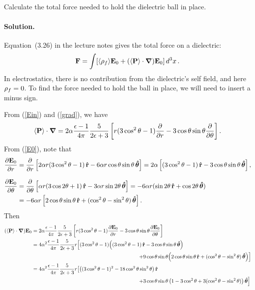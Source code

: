 \documentclass[11pt]{article}
\newcommand{\refeq}[1]{(\ref{#1})}
\newcommand{\beq}{\begin{equation*}}
\newcommand{\eeq}{\end{equation*}}
\newenvironment{problem}
{
	\subsection{}
	\color{darkgray}
    \ignorespaces
}
{

}
\newenvironment{solution}
{
    \paragraph{Solution.}
    \ignorespaces
}
{
    \bigskip
}
\begin{document}
\newcommand{\vF}{\vb{F}}

\begin{problem}
	Calculate the total force needed to hold the dielectric ball in place.
\end{problem}

\begin{solution}
	Equation~(3.26) in the lecture notes gives the total force on a dielectric:
	\beq
		\vF = \int [\evrhof\! \vEo + (\evP \cdot \grad) \vEo] \dcx.
	\eeq
	In electrostatics, there is no contribution from the dielectric's self field, and here $\rho_f = 0$.  To find the force needed to hold the ball in place, we will need to insert a minus sign.
	
	From \refeq{Ein} and \refeq{grad}, we have
	\beq
		\evP \cdot \grad = 2\alp \frac{\eps - 1}{4\pi} \frac{5}{2\eps + 3} \left[ r (3 \cos^2\tht - 1) \pdv{}{r} - 3 \cost \sint \pdv{}{\tht} \right].
	\eeq
	From \refeq{E0}, note that
	\begin{align*}
		\pdv{\vb{E}_0}{r} &= \pdv{}{r} \left[ 2 \alpha r (3 \cos^2\theta - 1) \,\vb{\hat{r}} - 6 \alpha r \cos\theta \sin\theta \,\boldsymbol{\hat{\theta}} \right]
		= 2 \alpha \left[ (3 \cos^2\theta - 1) \,\vb{\hat{r}} - 3 \cos\theta \sin\theta \,\boldsymbol{\hat{\theta}} \right], \\[2ex]
		\pdv{\vb{E}_0}{\theta} &= \pdv{}{\theta} \left[ \alpha r (3 \cos2\theta + 1) \,\vb{\hat{r}} - 3 \alpha r \sin2\theta \,\boldsymbol{\hat{\theta}} \right]
		= -6\alpha r (\sin2\theta \,\vb{\hat{r}} + \cos2\theta \,\boldsymbol{\hat{\theta}}) \\
		&= -6 \alpha r \left[ 2 \cos\theta \sin\theta \,\vb{\hat{r}} + (\cos^2\theta - \sin^2\theta) \,\boldsymbol{\hat{\theta}} \right].
	\end{align*}
	Then
	\begin{align*}
		(\evP \cdot \grad) \vEo &= 2\alp \frac{\eps - 1}{4\pi} \frac{5}{2\eps + 3} \left[ r (3 \cos^2\tht - 1) \pdv{\vEo}{r} - 3 \cost \sint \pdv{\vEo}{\tht} \right] \\
		&= 4\alp^2  \frac{\eps - 1}{4\pi} \frac{5}{2\eps + 3} r \!\left[ (3 \cos^2\tht - 1) \!\left( (3 \cos^2\tht - 1) \,\rh - 3 \cost \sint \,\thh \right)\! \right. \\
		&\phantom{mmmmmmmmmmmmmmmmmmmmmmm} \left. + 9 \cost \sint \!\left( 2 \cost \sint \,\rh + (\cos^2\tht - \sin^2\tht) \,\thh \right) \right] \\
		&= 4\alp^2  \frac{\eps - 1}{4\pi} \frac{5}{2\eps + 3} r \!\left[ \left( (3 \cos^2\tht - 1)^2 - 18 \cos^2\tht \sin^2\tht \right) \rh \right. \\
		&\phantom{mmmmmmmmmmmmmmmmmmmmmmm} \left. + 3 \cost \sint \left( 1 - 3\cos^2\tht + 3 (\cos^2\tht - \sin^2\tht) \right) \thh \right] \\

\end{align*}
\end{solution}
\end{document}
